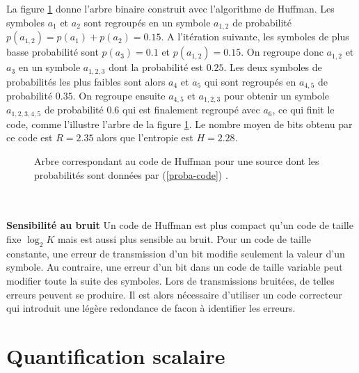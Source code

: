 La figure \ref{arbre-binaire} 
donne l'arbre binaire construit avec l'algorithme
de Huffman.
Les symboles $a_1$ et $a_2$ sont regroup\'es
en un symbole $a_{1,2}$ 
de probabilit\'e $p(a_{1,2}) = p(a_1)+p(a_2)= 0.15$. A l'it\'eration suivante,
les symboles de plus basse probabilit\'e sont
$p(a_3) = 0.1$ et $p(a_{1,2}) = 0.15$. On regroupe donc
$a_{1,2}$ et $a_3$ en un symbole $a_{1,2,3}$ dont la probabilit\'e
est $0.25$. Les deux symboles de probabilit\'es les plus faibles sont
alors $a_4$ et
$a_5$ qui sont regroup\'es en $a_{4,5}$ 
de probabilit\'e $0.35$. On regroupe ensuite $a_{4,5}$ et 
$a_{1,2,3}$ pour obtenir un symbole $a_{1,2,3,4,5}$ de probabilit\'e
$0.6$ qui est finalement regroup\'e avec $a_6$, ce qui finit
le code, comme l'illustre
l'arbre de la figure \ref{arbre-binaire}.
Le nombre moyen de bits obtenu par ce code est
$R= 2.35$ alors que l'entropie est $H = 2.28$.

\begin{figure}[bhtp]
\centerline{
        \epsfxsize=6cm
	\leavevmode{}}
\caption {Arbre correspondant au code de Huffman pour une
source dont les probabilit\'es sont donn\'ees par 
(\protect \ref{proba-code}) \protect \cite{vetterli}.} 
\label{arbre-binaire}
\end{figure}
\\
\\
\noindent
{\bf Sensibilit\'e au bruit}
Un code de Huffman est plus compact qu'un code de taille fixe
$\log_2 K$ mais est aussi plus sensible au bruit.
Pour un code de taille constante, une erreur 
de transmission d'un bit modifie
seulement la valeur d'un symbole.
Au contraire, une erreur d'un bit
dans un code de taille variable peut modifier toute la suite
des symboles.
Lors de transmissions bruit\'ees, de telles erreurs peuvent se
produire. Il est alors n\'ecessaire d'utiliser un code correcteur
qui introduit une l\'eg\`ere redondance de facon \`a identifier les
erreurs.

\section{Quantification scalaire}
\label{scalar-quant-sec}


